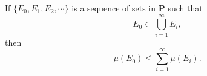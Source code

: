 If $\{E_0, E_1, E_2, \cdots\}$ is a sequence of sets in $\mathbf{P}$ such that
$$E_0 \subset \bigcup_{i=1}^{\infty} E_i,$$
then
$$\mu(E_0) \leq \sum_{i=1}^{\infty} \mu(E_i).$$
